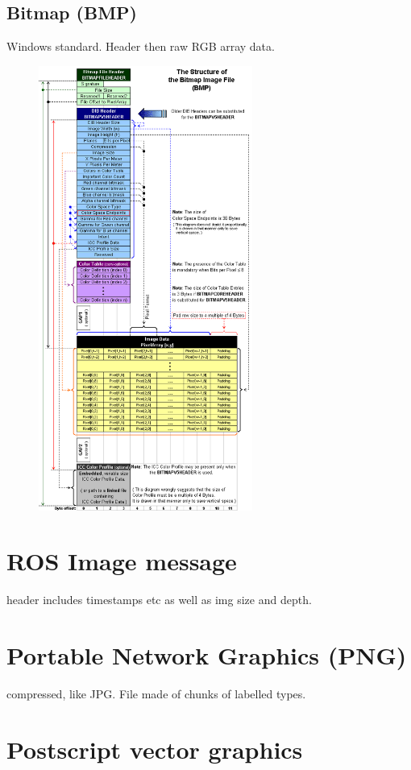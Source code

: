 \documentclass[oneside,english]{scrbook}
\begin{document}
\subsection{Bitmap (BMP)}

Windows standard. Header then raw RGB array data.

\begin{figure}
	\caption{}
	\includegraphics[width=7cm]{figs/BMPfileFormat}
\end{figure}



\section{ROS Image message}

header includes timestamps etc as well as img size and depth.


\section{Portable Network Graphics (PNG)}

compressed, like JPG. File made of chunks of labelled types.


\section{Postscript vector graphics}
\end{document}
